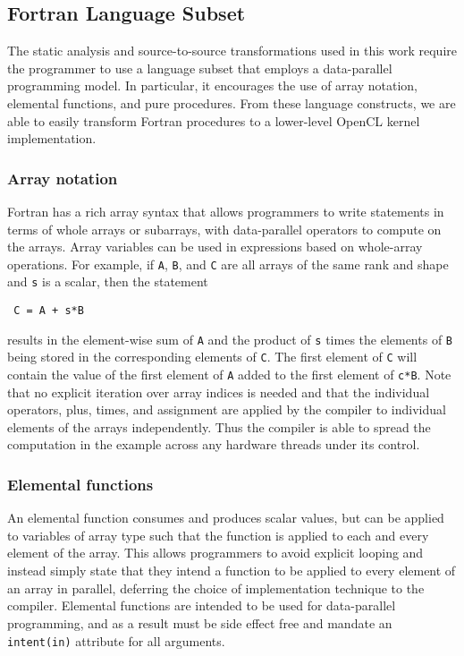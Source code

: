 \subsection{Fortran Language Subset}

The static analysis and source-to-source transformations used in this work
require the programmer to use a language subset that employs a data-parallel
programming model.  In particular, it encourages the use of array notation,
elemental functions, and pure procedures.  From these language constructs, we
are able to easily transform Fortran procedures to a lower-level OpenCL kernel
implementation.

\subsubsection*{Array notation}

Fortran has a rich array syntax that allows programmers to write statements in
terms of whole arrays or subarrays, with data-parallel operators to compute on
the arrays.  Array variables can be used in expressions based on whole-array
operations.  For example, if {\tt A}, {\tt B}, and {\tt C} are all arrays of the
same rank and shape and {\tt s} is a scalar, then the statement

{\small
\begin{verbatim}
 C = A + s*B
\end{verbatim}
}

\noindent
results in the element-wise sum of {\tt A} and the product of {\tt s} times the
elements of {\tt B} being stored in the corresponding elements of {\tt C}. The
first element of {\tt C} will contain the value of the first element of {\tt A}
added to the first element of {\tt c*B}.  Note that no explicit iteration over
array indices is needed and that the individual operators, plus, times, and
assignment are applied by the compiler to individual elements of the arrays
independently.  Thus the compiler is able to spread the computation in the
example across any hardware threads under its control.

\subsubsection*{Elemental functions}

An elemental function consumes and produces scalar values, but can be applied to
variables of array type such that the function is applied to each and every
element of the array.  This allows programmers to avoid explicit looping and
instead simply state that they intend a function to be applied to every element
of an array in parallel, deferring the choice of implementation technique to the
compiler.  Elemental functions are intended to be used for data-parallel
programming, and as a result must be side effect free and mandate an {\tt
intent(in)} attribute for all arguments.


